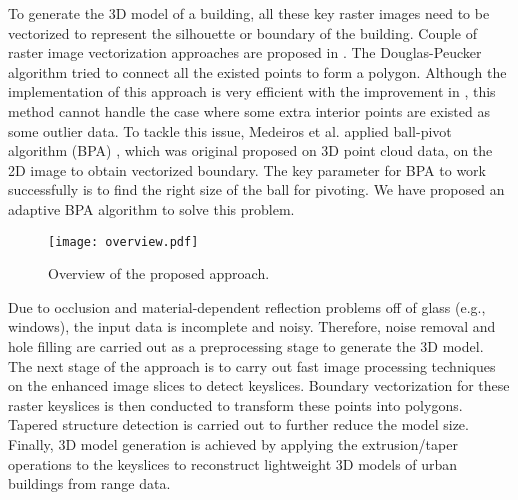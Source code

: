To generate the 3D model of a building, all these key raster images need 
to be vectorized to represent the silhouette or boundary of the building. 
Couple of raster image vectorization approaches are
proposed in \cite{DP_AAKMT, DP_DP, DP_WM}. The Douglas-Peucker
algorithm tried to connect all the existed points to form a polygon. 
Although the implementation of
this approach is very efficient with the improvement in \cite{DP_HS},  this method cannot
handle the case where some extra interior points are existed as some outlier data.
To tackle this issue, Medeiros et al. \cite{BPA_MVL} applied ball-pivot algorithm (BPA)
\cite{BPA_BMRS}, which was original proposed on 3D point cloud data, on the 2D image to obtain
vectorized boundary. The key parameter for BPA to work successfully is to find the right size of
the ball for pivoting. We have proposed an adaptive BPA algorithm to solve this problem.

\begin{figure}[htbp]
\begin{center}
\texttt{[image: overview.pdf]}
\end{center}
\caption{Overview of the proposed approach.}
\label{fig:ov}
\end{figure}

Due to occlusion and material-dependent reflection problems off of glass
(e.g., windows), the input data is incomplete and noisy.
Therefore, noise removal and hole filling are carried out as a
preprocessing stage to generate the 3D model.
The next stage of the approach is to carry out fast image processing
techniques on the enhanced image slices to detect keyslices.
Boundary vectorization for these raster keyslices is then conducted to
transform these points into polygons.
Tapered structure detection is carried out to further reduce the model size.
Finally, 3D model generation is achieved by applying the extrusion/taper
operations to the keyslices to reconstruct lightweight 3D models of urban
buildings from range data.


\label{sec:prep}

